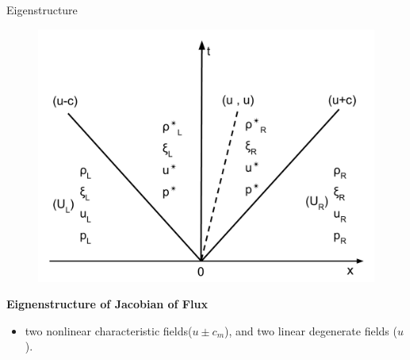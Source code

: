 \documentclass{beamer}
\begin{document}
\begin{frame}{Eigenstructure}
\noindent
\begin{minipage}{.54\textwidth}
\begin{figure}
\centering
\includegraphics[width=.85\textwidth]{./Chapter-2/Figures/Solution_Structure_RP}
\label{fig:Domain_3D}
\end{figure}
\large{\textbf{Eignenstructure of Jacobian of Flux}}
\begin{itemize}
\item two nonlinear characteristic fields($u \pm c_m$), and two linear degenerate fields ($u$).
\end{itemize} 


\end{minipage}
\end{frame}
\end{document}
